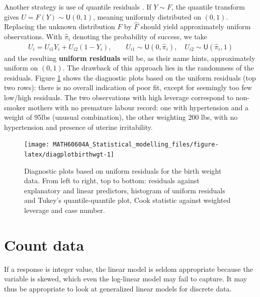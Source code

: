 \documentclass[
  11pt,
  letterpaper,
]{book}
\theoremstyle{definition}
\theoremstyle{definition}
\theoremstyle{definition}
\theoremstyle{remark}
\begin{document}
Another strategy is use of quantile residuals
\citep{Brillinger/Preisler:1983}. If \(Y \sim F\), the quantile transform gives \(U=F(Y) \sim \mathsf{U}(0,1)\), meaning uniformly distributed on \((0,1)\). Replacing the unknown distribution \(F\) by \(\widehat{F}\) should yield approximately uniform observations. With \(\widehat{\pi}_i\) denoting the probability of success, we take
\begin{align*}
U_i = U_{i1} Y_i + U_{i2}(1-Y_i), \qquad U_{i1} \sim \mathsf{U}(0, \widehat{\pi}_i), \quad U_{i2} \sim \mathsf{U}(\widehat{\pi}_i, 1)
\end{align*}
and the resulting \textbf{uniform residuals} will be, as their name hints, approximately uniform on \((0,1)\). The drawback of this approach lies in the randomness of the residuals. Figure \ref{fig:diagplotbirthwgt} shows the diagnostic plots based on the uniform residuals (top two rows): there is no overall indication of poor fit, except for seemingly too few low/high residuals. The two observations with high leverage correspond to non-smoker mothers with no premature labour record: one with hypertension and a weight of 95lbs (unusual combination), the other weighting 200 lbs, with no hypertension and presence of uterine
irritability.

\begin{figure}

{\centering \texttt{[image: MATH60604A\_Statistical\_modelling\_files/figure-latex/diagplotbirthwgt-1]} 

}

\caption{Diagnostic plots based on uniform residuals for the birth weight data. From left to right, top to bottom: residuals against explanatory and linear predictors, histogram of uniform residuals and Tukey's quantile-quantile plot, Cook statistic against weighted leverage and case number. }\label{fig:diagplotbirthwgt}
\end{figure}

\hypertarget{count-data}{%
\section{Count data}\label{count-data}}

If a response is integer value, the linear model is seldom appropriate because the variable is skewed, which even the log-linear model may fail to capture. It may thus be appropriate to look at generalized linear models for discrete data.
\end{document}
